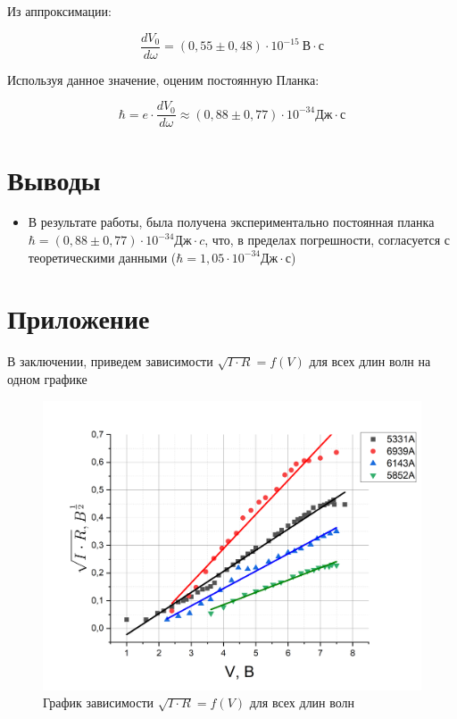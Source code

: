 \documentclass[a4paper,12pt]{article}
\begin{document}
Из аппроксимации:

$$
	\frac{dV_0}{d \omega} = ( 0,55 \pm 0,48 ) \cdot 10^{-15} \ В \cdot с
$$

Используя данное значение, оценим постоянную Планка:

$$
	\hbar = e \cdot \frac{dV_0}{d \omega} \approx (0,88 \pm 0,77) \cdot 10^{-34} Дж \cdot с	
$$

\section*{Выводы}

\begin{itemize}
	\item В результате работы, была получена экспериментально постоянная планка \linebreak $\hbar = (0,88 \pm 0,77) \cdot 10^{-34} Дж \cdot c$, что, в пределах погрешности, согласуется с теоретическими данными ($\hbar = 1,05 \cdot 10^{-34} Дж \cdot с$) 
\end{itemize}

\newpage

\section*{Приложение}

В заключении, приведем зависимости $\sqrt{I \cdot R} = f(V)$ для всех длин волн на одном графике

\begin{figure}[h!]
	\centering
	\includegraphics[width = \linewidth]{all_in_one}
	\caption{График зависимости $\sqrt{I \cdot R} = f(V)$ для всех длин волн}
\end{figure}
\end{document}

